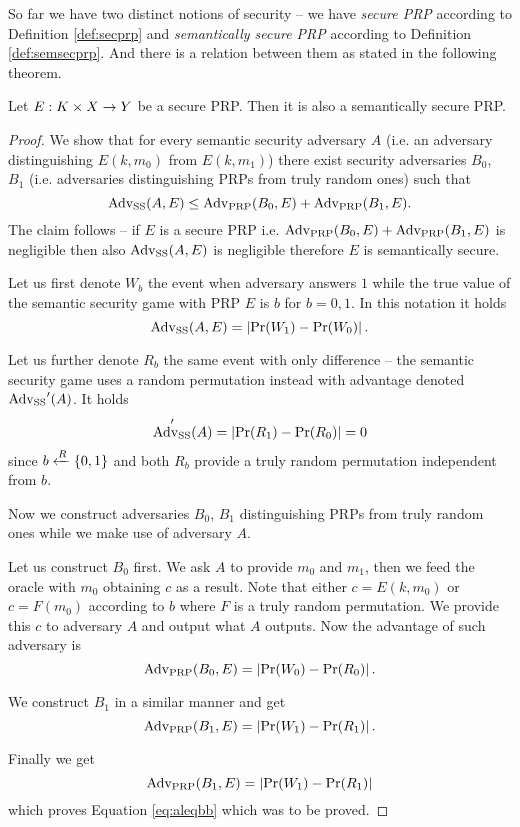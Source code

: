 So far we have two distinct notions of security -- we have {\em secure PRP} according to Definition \ref{def:secprp} and {\em semantically secure PRP} according to Definition \ref{def:semsecprp}. And there is a relation between them as stated in the following theorem.

\begin{thm}
	Let $E: K\times X\rightarrow Y$ be a secure PRP. Then it is also a semantically secure PRP.
\end{thm}
\begin{proof}
	We show that for every semantic security adversary $A$ (i.e. an adversary distinguishing $E(k,m_0)$ from $E(k,m_1)$) there exist security adversaries $B_0$, $B_1$ (i.e. adversaries distinguishing PRPs from truly random ones) such that
	\begin{equation}
	\label{eq:aleqbb}
		\operatorname*{Adv_{SS}}(A,E) \leq \operatorname*{Adv_{PRP}}(B_0,E) + \operatorname*{Adv_{PRP}}(B_1,E) .
	\end{equation}
	The claim follows -- if $E$ is a secure PRP i.e. $\operatorname*{Adv_{PRP}}(B_0,E) + \operatorname*{Adv_{PRP}}(B_1,E)$ is negligible then also $\operatorname*{Adv_{SS}}(A,E)$ is negligible therefore $E$ is semantically secure.
	
	Let us first denote $W_b$ the event when adversary answers $1$ while the true value of the semantic security game with PRP $E$ is $b$ for $b=0,1$. In this notation it holds
	\[
		\operatorname*{Adv_{SS}}(A,E) = \left| \Pr(W_1) - \Pr(W_0) \right| .
	\]
	
	Let us further denote $R_b$ the same event with only difference -- the semantic security game uses a random permutation instead with advantage denoted $\operatorname*{Adv_{SS}}'(A)$. It holds
	\[
		\operatorname*{Adv_{SS}}'(A) = \left| \Pr(R_1) - \Pr(R_0) \right| = 0
	\]
	since $b\xleftarrow{R}\{0,1\}$ and both $R_b$ provide a truly random permutation independent from $b$.
	
	Now we construct adversaries $B_0$, $B_1$ distinguishing PRPs from truly random ones while we make use of adversary $A$.
	
	Let us construct $B_0$ first. We ask $A$ to provide $m_0$ and $m_1$, then we feed the oracle with $m_0$ obtaining $c$ as a result. Note that either $c=E(k,m_0)$ or $c=F(m_0)$ according to $b$ where $F$ is a truly random permutation. We provide this $c$ to adversary $A$ and output what $A$ outputs. Now the advantage of such adversary is
	\[
		\operatorname*{Adv_{PRP}}(B_0,E) = \left| \Pr(W_0) - \Pr(R_0) \right| .
	\]
	
	We construct $B_1$ in a similar manner and get
	\[
		\operatorname*{Adv_{PRP}}(B_1,E) = \left| \Pr(W_1) - \Pr(R_1) \right| .
	\]
	
	Finally we get
	\[
		\operatorname*{Adv_{PRP}}(B_1,E) = \left| \Pr(W_1) - \Pr(R_1) \right|
	\]
	which proves Equation \ref{eq:aleqbb} which was to be proved.
\end{proof}

